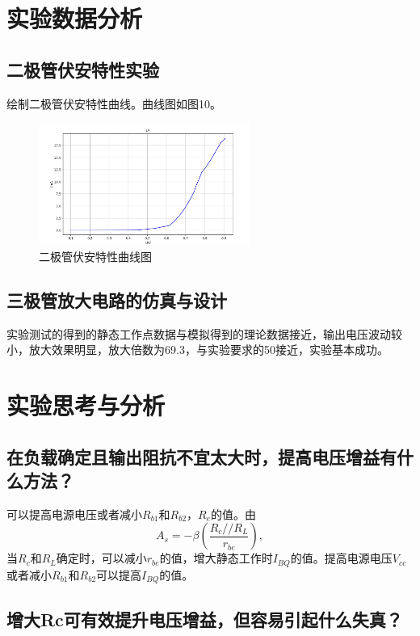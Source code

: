 \documentclass[]{article}
\begin{document}
\section{实验数据分析}

\subsection{二极管伏安特性实验}

绘制二极管伏安特性曲线。曲线图如图10。

\begin{figure}[h]
	\centering
	\includegraphics[height=4cm]{img/6_1}
	\caption{二极管伏安特性曲线图}
\end{figure}

\subsection{三极管放大电路的仿真与设计}

实验测试的得到的静态工作点数据与模拟得到的理论数据接近，输出电压波动较小，放大效果明显，放大倍数为69.3，与实验要求的50接近，实验基本成功。

\section{实验思考与分析}

\subsection{在负载确定且输出阻抗不宜太大时，提高电压增益有什么方法？}

可以提高电源电压或者减小$R_{b1}$和$R_{b2}$，$R_e$的值。由
\[ A_s = -\beta \left( \frac{R_c // R_L}{r_{be}} \right), \]
当$R_c$和$R_L$确定时，可以减小$r_{be}$的值，增大静态工作时$I_{BQ}$的值。提高电源电压$V_{cc}$或者减小$R_{b1}$和$R_{b2}$可以提高$I_{BQ}$的值。



\subsection{增大Rc可有效提升电压增益，但容易引起什么失真？}
\end{document}
